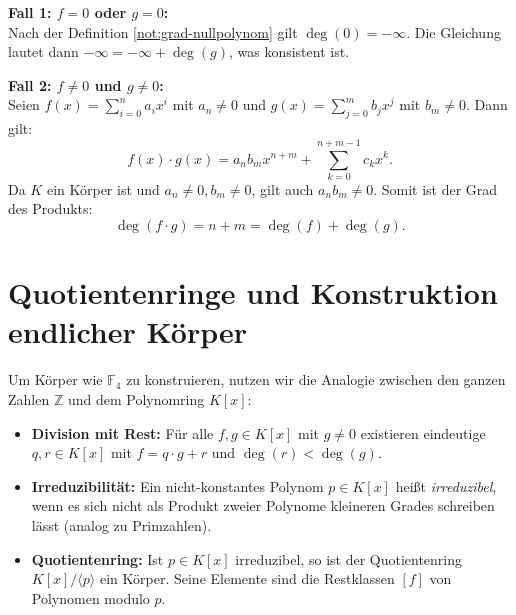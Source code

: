 \begin{math-stroke}

\begin{short-proof}
\textbf{Fall 1: $f=0$ oder $g=0$:} \\
Nach der Definition \ref{not:grad-nullpolynom} gilt $\deg(0) = -\infty$. Die Gleichung lautet dann $-\infty = -\infty + \deg(g)$, was konsistent ist.

\textbf{Fall 2: $f \neq 0$ und $g \neq 0$:} \\
Seien $f(x) = \sum_{i=0}^n a_i x^i$ mit $a_n \neq 0$ und $g(x) = \sum_{j=0}^m b_j x^j$ mit $b_m \neq 0$. Dann gilt:
\[
f(x) \cdot g(x) = a_n b_m x^{n+m} + \sum_{k=0}^{n+m-1} c_k x^k.
\]
Da $K$ ein Körper ist und $a_n \neq 0, b_m \neq 0$, gilt auch $a_n b_m \neq 0$. Somit ist der Grad des Produkts:
\[
\deg(f \cdot g) = n + m = \deg(f) + \deg(g).
\]
\end{short-proof}
\end{math-stroke}

\section{Quotientenringe und Konstruktion endlicher Körper}

\begin{nice-box}
Um Körper wie $\mathbb{F}_4$ zu konstruieren, nutzen wir die Analogie zwischen den ganzen Zahlen $\mathbb{Z}$ und dem Polynomring $K[x]$:
\begin{itemize}
    \item \textbf{Division mit Rest:} Für alle $f, g \in K[x]$ mit $g \neq 0$ existieren eindeutige $q, r \in K[x]$ mit $f = q \cdot g + r$ und $\deg(r) < \deg(g)$.
    \item \textbf{Irreduzibilität:} Ein nicht-konstantes Polynom $p \in K[x]$ heißt \emph{irreduzibel}, wenn es sich nicht als Produkt zweier Polynome kleineren Grades schreiben lässt (analog zu Primzahlen).
    \item \textbf{Quotientenring:} Ist $p \in K[x]$ irreduzibel, so ist der Quotientenring $K[x]/\langle p \rangle$ ein Körper. Seine Elemente sind die Restklassen $[f]$ von Polynomen modulo $p$.
\end{itemize}
\end{nice-box}

